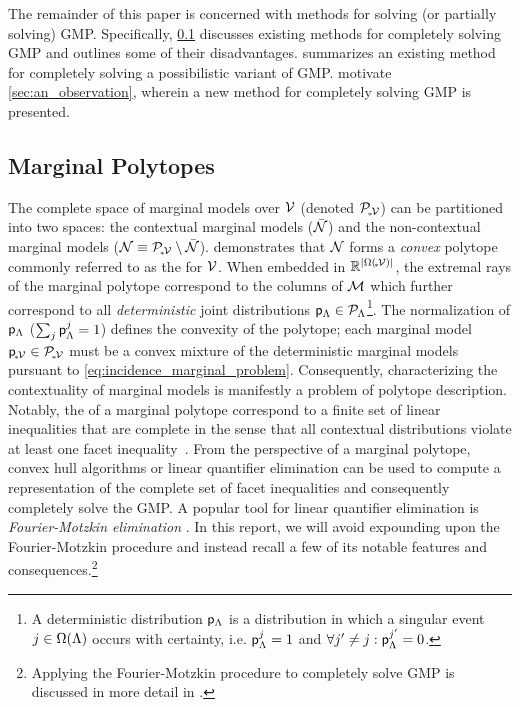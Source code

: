\documentclass[aps, 10pt, english, twoside, twocolumn, pra, nofootinbib, tightenlines, longbibliography, superscriptaddress]{revtex4-1}
\begin{document}
    The remainder of this paper is concerned with methods for solving (or partially solving) GMP. Specifically, \cref{sec:marginal_polytopes} discusses existing methods for completely solving GMP and outlines some of their disadvantages.  summarizes an existing method for completely solving a possibilistic variant of GMP.  motivate \cref{sec:an_observation}, wherein a new method for completely solving GMP is presented.

    \subsection{Marginal Polytopes}
    \label{sec:marginal_polytopes}
    The complete space of marginal models over $\mathcal{V}$ (denoted $\mathcal{P}_{\!{}_*\!\mathcal{V}}$) can be partitioned into two spaces: the contextual marginal models ($\bar{\mathcal{N}}$) and the non-contextual marginal models ($\mathcal{N} \equiv \mathcal{P}_{\!{}_*\!\mathcal{V}} \setminus \bar{\mathcal{N}}$). \citet{Pitowsky_1991} demonstrates that $\mathcal{N}$ forms a \textit{convex} polytope commonly referred to as the  for $\mathcal{V}$. When embedded in $\R^{\abs{\events{\mscenariowrap}}}$, the extremal rays of the marginal polytope correspond to the columns of $\mathcal{M}$ which further correspond to all \textit{deterministic} joint distributions ${\mathsf{p}}_{\Lambda} \in \mathcal{P}_{\Lambda}$\footnote{A deterministic distribution ${\mathsf{p}}_{\Lambda}$ is a distribution in which a singular event $j \in \events{\jointvar}$ occurs with certainty, i.e. ${\mathsf{p}}_{\Lambda}^{j} = 1$ and $\forall j' \neq j: {\mathsf{p}}_{\Lambda}^{j'} = 0$. }. The normalization of ${\mathsf{p}}_{\Lambda}$ ($\sum_{j} {\mathsf{p}}_{\Lambda}^{j} = 1$) defines the convexity of the polytope; each marginal model ${\mathsf{p}}_{\!{}_*\!\mathcal{V}} \in \mathcal{P}_{\!{}_*\!\mathcal{V}}$ must be a convex mixture of the deterministic marginal models pursuant to \cref{eq:incidence_marginal_problem}. Consequently, characterizing the contextuality of marginal models is manifestly a problem of polytope description. Notably, the  of a marginal polytope correspond to a finite set of linear inequalities that are complete in the sense that all contextual distributions violate at least one facet inequality~\cite{Brunner_2013}. From the perspective of a marginal polytope, convex hull algorithms or linear quantifier elimination can be used to compute a representation of the complete set of facet inequalities and consequently completely solve the GMP. A popular tool for linear quantifier elimination is \textit{Fourier-Motzkin elimination} \cite{Dantzig_1973,Inflation,Abramsky_2012,jones_2004}. In this report, we will avoid expounding upon the Fourier-Motzkin procedure and instead recall a few of its notable features and consequences.\footnote{Applying the Fourier-Motzkin procedure to completely solve GMP is discussed in more detail in \citet{Fritz_2011}.}
\end{document}
